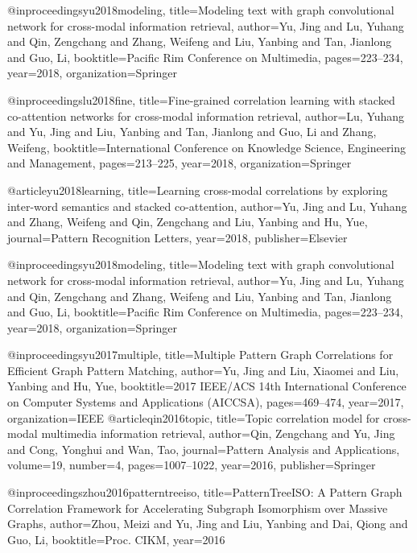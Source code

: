 @inproceedings{yu2018modeling,
  title={Modeling text with graph convolutional network for cross-modal information retrieval},
  author={Yu, Jing and Lu, Yuhang and Qin, Zengchang and Zhang, Weifeng and Liu, Yanbing and Tan, Jianlong and Guo, Li},
  booktitle={Pacific Rim Conference on Multimedia},
  pages={223--234},
  year={2018},
  organization={Springer}
}

@inproceedings{lu2018fine,
  title={Fine-grained correlation learning with stacked co-attention networks for cross-modal information retrieval},
  author={Lu, Yuhang and Yu, Jing and Liu, Yanbing and Tan, Jianlong and Guo, Li and Zhang, Weifeng},
  booktitle={International Conference on Knowledge Science, Engineering and Management},
  pages={213--225},
  year={2018},
  organization={Springer}
}

@article{yu2018learning,
  title={Learning cross-modal correlations by exploring inter-word semantics and stacked co-attention},
  author={Yu, Jing and Lu, Yuhang and Zhang, Weifeng and Qin, Zengchang and Liu, Yanbing and Hu, Yue},
  journal={Pattern Recognition Letters},
  year={2018},
  publisher={Elsevier}
}

@inproceedings{yu2018modeling,
  title={Modeling text with graph convolutional network for cross-modal information retrieval},
  author={Yu, Jing and Lu, Yuhang and Qin, Zengchang and Zhang, Weifeng and Liu, Yanbing and Tan, Jianlong and Guo, Li},
  booktitle={Pacific Rim Conference on Multimedia},
  pages={223--234},
  year={2018},
  organization={Springer}
}


@inproceedings{yu2017multiple,
  title={Multiple Pattern Graph Correlations for Efficient Graph Pattern Matching},
  author={Yu, Jing and Liu, Xiaomei and Liu, Yanbing and Hu, Yue},
  booktitle={2017 IEEE/ACS 14th International Conference on Computer Systems and Applications (AICCSA)},
  pages={469--474},
  year={2017},
  organization={IEEE}
}
@article{qin2016topic,
  title={Topic correlation model for cross-modal multimedia information retrieval},
  author={Qin, Zengchang and Yu, Jing and Cong, Yonghui and Wan, Tao},
  journal={Pattern Analysis and Applications},
  volume={19},
  number={4},
  pages={1007--1022},
  year={2016},
  publisher={Springer}
}

@inproceedings{zhou2016patterntreeiso,
  title={PatternTreeISO: A Pattern Graph Correlation Framework for Accelerating Subgraph Isomorphism over Massive Graphs},
  author={Zhou, Meizi and Yu, Jing and Liu, Yanbing and Dai, Qiong and Guo, Li},
  booktitle={Proc. CIKM},
  year={2016}
}

